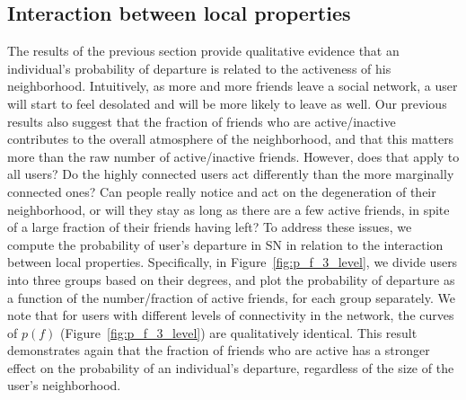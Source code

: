 \documentclass[phd,tocprelim]{cornell}
\renewcommand{\caption}[1]{\singlespacing\hangcaption{#1}\normalspacing}
\begin{document}



\subsection{Interaction between local properties}

The results of the previous section provide qualitative evidence that an individual's probability of departure is related to the activeness of his neighborhood. Intuitively, as more and more friends leave a social network, a user will start to feel desolated and will be more likely to leave as well. Our previous results also suggest that the fraction of friends who are active/inactive contributes to the overall atmosphere of the neighborhood, and that this matters more than the raw number of active/inactive friends. However, does that apply to all users? Do the highly connected users act differently than the more marginally connected ones? Can people really notice and act on the degeneration of their neighborhood, or will they stay as long as there are a few active friends, in spite of a large fraction of their friends having left? To address these issues, we compute the probability of user's departure in SN in relation to the interaction between local properties. Specifically, in Figure~\ref{fig:p_f_3_level}, we divide users into three groups based on their degrees, and plot the probability of departure as a function of the number/fraction of active friends, for each group separately. We note that for users with different levels of connectivity in the network, the curves of $p(f)$ (Figure~\ref{fig:p_f_3_level}) are qualitatively identical. This result demonstrates again that the fraction of friends who are active has a stronger effect on the probability of an individual's departure, regardless of the size of the user's neighborhood.
\end{document}
